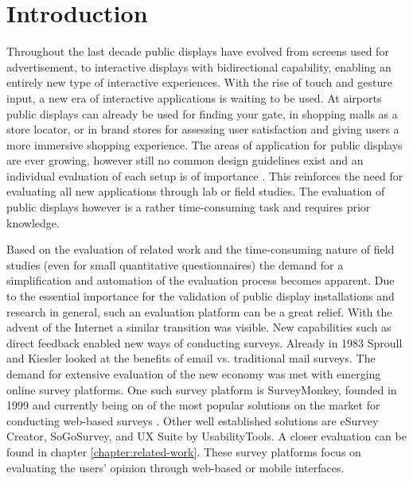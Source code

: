\section{Introduction}
\label{sec:introduction}

	Throughout the last decade public displays have evolved from screens used for advertisement, to interactive displays with bidirectional capability, enabling an entirely new type of interactive experiences. With the rise of touch and gesture input, a new era of interactive applications is waiting to be used. At airports public displays can already be used for finding your gate, in shopping malls as a store locator, or in brand stores for assessing user satisfaction and giving users a more immersive shopping experience. The areas of application for public displays are ever growing, however still no common design guidelines exist \cite{Alt2012HowToEvaluate} and an individual evaluation of each setup is of importance \cite{muller2010requirements}. This reinforces the need for evaluating all new applications through lab or field studies. The evaluation of public displays however is a rather time-consuming task and requires prior knowledge. 


	Based on the evaluation of related work and the time-consuming nature of field studies (even for small quantitative questionnaires) the demand for a simplification and automation of the evaluation process becomes apparent. Due to the essential importance for the validation of public display installations and research in general, such an evaluation platform can be a great relief. 
	With the advent of the Internet a similar transition was visible. 
	New capabilities such as direct feedback enabled new ways of conducting surveys. Already in 1983 Sproull and Kiesler \cite{sproull1986reducing} looked at the benefits of email vs. traditional mail surveys. The demand for extensive evaluation of the new economy was met with emerging online survey platforms. One such survey platform is SurveyMonkey, founded in 1999 and currently being on of the most popular solutions on the market for conducting web-based surveys \cite{SurveyMonkeyAboutUs}. Other well established solutions are eSurvey Creator, SoGoSurvey, and UX Suite by UsabilityTools. A closer evaluation can be found in chapter \ref{chapter:related-work}. These survey platforms focus on evaluating the users' opinion through web-based or mobile interfaces. 


